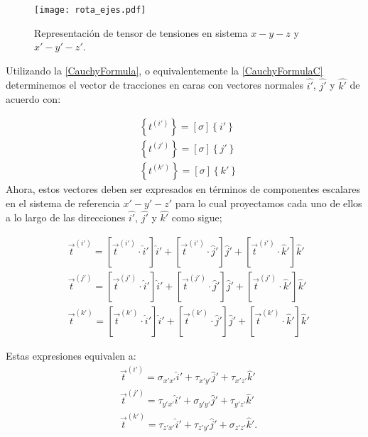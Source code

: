 \documentclass[../notas medios.tex]{subfiles}
\begin{document}
\begin{figure}[H]
\centering
	\texttt{[image: rota\_ejes.pdf]}
	\caption{Representación de tensor de tensiones en sistema $x-y-z$ y $x'-y'-z'$.}
	\label{roteje}
\end{figure}


Utilizando la \cref{CauchyFormula}, o equivalentemente la \cref{CauchyFormulaC} determinemos el vector de tracciones en caras
con vectores normales $\hat{i'}$, $\hat{j'}$ y $\hat{k'}$ de acuerdo con:
%

\begin{equation}
\begin{aligned}
&\left\{ {{t^{(i')}}} \right\} = \left[ \sigma  \right]\left\{ i' \right\} \\
&\left\{ {{t^{(j')}}} \right\} = \left[ \sigma  \right]\left\{ j' \right\} \\
&\left\{ {{t^{(k')}}} \right\} = \left[ \sigma  \right]\left\{ k' \right\}
\end{aligned}
\label{proy1}
\end{equation}
%
Ahora, estos vectores deben ser expresados en términos de componentes escalares en el sistema de referencia $x'-y'-z'$ para lo cual proyectamos cada uno de ellos a lo largo de las direcciones $\hat{i'}$, $\hat{j'}$ y $\hat{k'}$ como sigue;

\begin{equation}
\begin{aligned}
&{{\vec t}^{(i')}} = [{{\vec t}^{(i')}} \cdot \hat i']\hat i' + [{{\vec t}^{(i')}} \cdot \hat j']\hat j' + [{{\vec t}^{(i')}} \cdot \hat k']\hat k' \\
&{{\vec t}^{(j')}} = [{{\vec t}^{(j')}} \cdot \hat i']\hat i' + [{{\vec t}^{(j')}} \cdot \hat j']\hat j' + [{{\vec t}^{(j')}} \cdot \hat k']\hat k' \\
&{{\vec t}^{(k')}} = [{{\vec t}^{(k')}} \cdot \hat i']\hat i' + [{{\vec t}^{(k')}} \cdot \hat j']\hat j' + [{{\vec t}^{(k')}} \cdot \hat k']\hat k'
\end{aligned}
\label{proy2}
\end{equation}

Estas expresiones equivalen a:
%
\begin{align*}
& {{\vec t}^{(i')}} = {\sigma _{x'x'}}\hat i' + {\tau _{x'y'}}\hat j' + {\tau _{x'z'}}\hat k' \\
& {{\vec t}^{(j')}} = {\tau _{y'x'}}\hat i' + {\sigma _{y'y'}}\hat j' + {\tau _{y'z'}}\hat k' \\
&{{\vec t}^{(k')}} = {\tau _{z'x'}}\hat i' + {\tau _{z'y'}}\hat j' + {\sigma _{z'z'}}\hat k'.
\end{align*} \\
\end{document}
